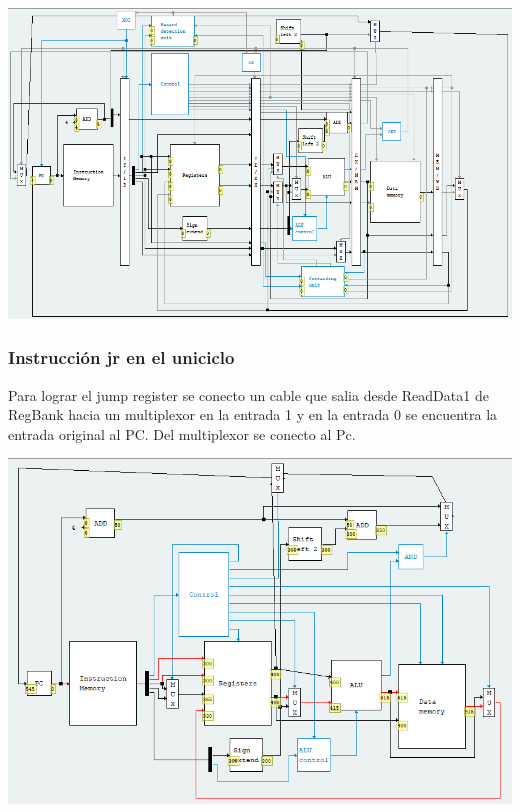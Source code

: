 \textbf{}\documentclass{article}
\begin{document}
\begin{minipage}{\linewidth}
   \includegraphics[scale=0.6, center]{J-en-pipeline.png}
\end{minipage}

\subsubsection{Instrucción jr en el uniciclo}
Para lograr el jump register se conecto un cable que salia desde ReadData1 de RegBank hacia un multiplexor en la entrada 1 y en la entrada 0 se encuentra la entrada original al PC. Del multiplexor se conecto al Pc.

\begin{minipage}{\linewidth}
   \includegraphics[scale=0.6, center]{jr-unicycle.png}
\end{minipage}
\end{document}

